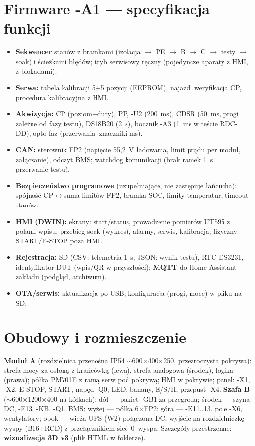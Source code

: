 \documentclass[11pt,a4paper]{article}
\begin{document}
\section{Firmware -A1 --- specyfikacja funkcji}
\begin{itemize}
\item \textbf{Sekwencer} stanów z bramkami (izolacja $\to$ PE $\to$ B $\to$ C $\to$ testy $\to$
soak) i ścieżkami błędów; tryb serwisowy ręczny (pojedyncze aparaty z HMI, z blokadami).
\item \textbf{Serwa:} tabela kalibracji 5+5 pozycji (EEPROM), najazd, weryfikacja CP, procedura
kalibracyjna z HMI.
\item \textbf{Akwizycja:} CP (poziom+duty), PP, -U2 (200~ms), CDSR (50~ms, progi zależne od fazy
testu), DS18B20 (2~s), bocznik -A3 (1~ms w teście RDC-DD), opto faz (przerwania, znaczniki ms).
\item \textbf{CAN:} sterownik FP2 (napięcie 55,2~V ładowania, limit prądu per moduł, załączanie),
odczyt BMS; watchdog komunikacji (brak ramek 1~s $=$ przerwanie testu).
\item \textbf{Bezpieczeństwo programowe} (uzupełniające, nie zastępuje łańcucha): spójność
CP$\leftrightarrow$suma limitów FP2, bramka SOC, limity temperatur, timeout stanów.
\item \textbf{HMI (DWIN):} ekrany: start/status, prowadzenie pomiarów UT595 z polami wpisu,
przebieg soak (wykres), alarmy, serwis, kalibracja; fizyczny START/E-STOP poza HMI.
\item \textbf{Rejestracja:} SD (CSV: telemetria 1~s; JSON: wynik testu), RTC DS3231, identyfikator
DUT (wpis/QR w przyszłości); \textbf{MQTT} do Home Assistant zakładu (podgląd, archiwum).
\item \textbf{OTA/serwis:} aktualizacja po USB; konfiguracja (progi, moce) w pliku na SD.
\end{itemize}

\section{Obudowy i rozmieszczenie}
\textbf{Moduł A} (rozdzielnica przenośna IP54 $\sim$600$\times$400$\times$250, przezroczysta
pokrywa): strefa mocy za osłoną z krańcówką (lewa), strefa analogowa (środek), logika (prawa);
półka PM701E z ramą serw pod pokrywą; HMI w pokrywie; panel: -X1, -X2, E-STOP, START, napęd -Q0,
LED, banany, E/S/H, przepust -X4. \textbf{Szafa B} ($\sim$600$\times$1200$\times$400 na kółkach):
dół --- pakiet -GB1 za przegrodą; środek --- szyna DC, -F13, -KB, -Q1, BMS; wyżej --- półka
6$\times$FP2; góra --- -K11..13, pole -X6, wentylatory; obok --- wieża UPS (W2) połączona DC;
wyjście na rozdzielniczkę wyspy (B16+RCD) z przełącznikiem sieć--0--wyspa. Szczegóły przestrzenne:
\textbf{wizualizacja 3D v3} (plik HTML w folderze).
\end{document}
